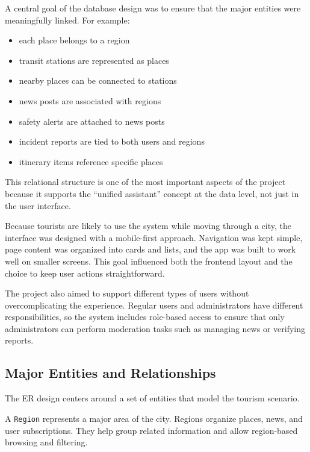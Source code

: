 A central goal of the database design was to ensure that the major entities were meaningfully linked. For example:
\begin{itemize}
    \item each place belongs to a region
    \item transit stations are represented as places
    \item nearby places can be connected to stations
    \item news posts are associated with regions
    \item safety alerts are attached to news posts
    \item incident reports are tied to both users and regions
    \item itinerary items reference specific places
\end{itemize}

This relational structure is one of the most important aspects of the project because it supports the ``unified assistant'' concept at the data level, not just in the user interface.


Because tourists are likely to use the system while moving through a city, the interface was designed with a mobile-first approach. Navigation was kept simple, page content was organized into cards and lists, and the app was built to work well on smaller screens. This goal influenced both the frontend layout and the choice to keep user actions straightforward.


The project also aimed to support different types of users without overcomplicating the experience. Regular users and administrators have different responsibilities, so the system includes role-based access to ensure that only administrators can perform moderation tasks such as managing news or verifying reports.

\subsection{Major Entities and Relationships}

The ER design centers around a set of entities that model the tourism scenario.


A \texttt{Region} represents a major area of the city. Regions organize places, news, and user subscriptions. They help group related information and allow region-based browsing and filtering.

